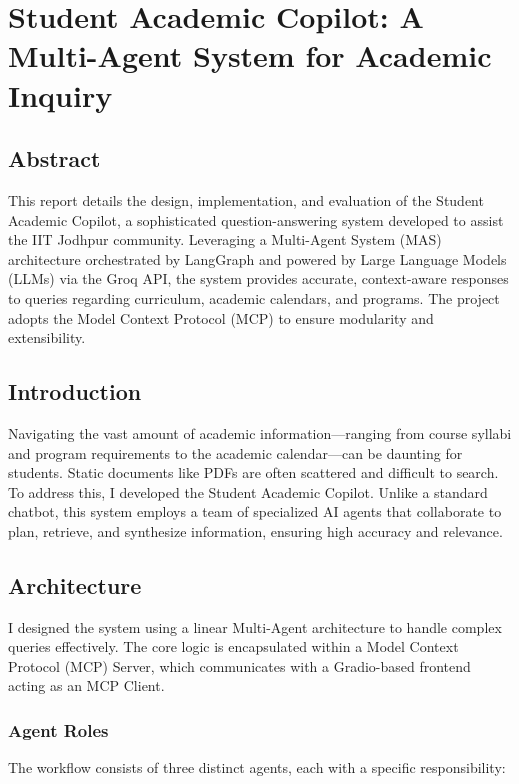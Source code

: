 \section{Student Academic Copilot: A Multi-Agent System for Academic Inquiry}

\subsection{Abstract}
This report details the design, implementation, and evaluation of the Student Academic Copilot, a sophisticated question-answering system developed to assist the IIT Jodhpur community. Leveraging a Multi-Agent System (MAS) architecture orchestrated by LangGraph and powered by Large Language Models (LLMs) via the Groq API, the system provides accurate, context-aware responses to queries regarding curriculum, academic calendars, and programs. The project adopts the Model Context Protocol (MCP) to ensure modularity and extensibility.

\subsection{Introduction}
Navigating the vast amount of academic information—ranging from course syllabi and program requirements to the academic calendar—can be daunting for students. Static documents like PDFs are often scattered and difficult to search. To address this, I developed the Student Academic Copilot. Unlike a standard chatbot, this system employs a team of specialized AI agents that collaborate to plan, retrieve, and synthesize information, ensuring high accuracy and relevance.

\subsection{Architecture}
I designed the system using a linear Multi-Agent architecture to handle complex queries effectively. The core logic is encapsulated within a Model Context Protocol (MCP) Server, which communicates with a Gradio-based frontend acting as an MCP Client.

\subsubsection{Agent Roles}
The workflow consists of three distinct agents, each with a specific responsibility:

